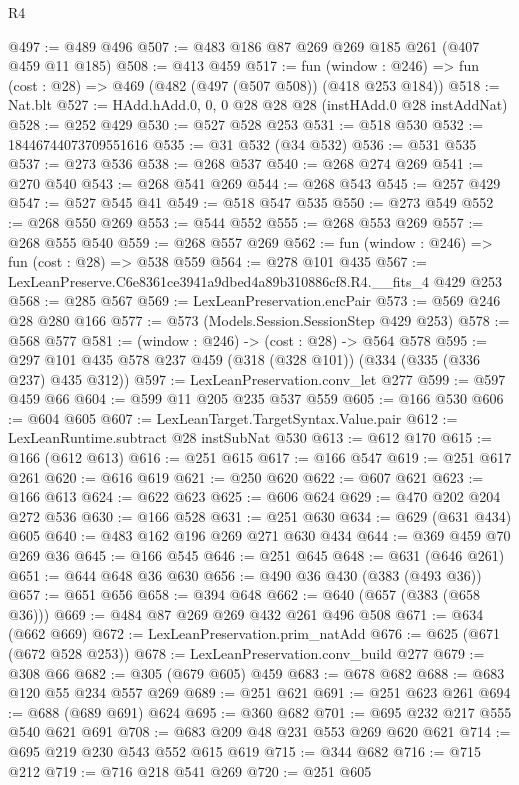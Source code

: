 \begin{lexlean}{R4}
\begin{coremodule}
@497 := @489 @496
@507 := @483 @186 @87 @269 @269 @185 @261 (@407 @459 @11 @185)
@508 := @413 @459
@517 := fun (window : @246) => fun (cost : @28) => @469 (@482 (@497 (@507 @508)) (@418 @253 @184))
@518 := Nat.blt
@527 := HAdd.hAdd.{0, 0, 0} @28 @28 @28 (instHAdd.{0} @28 instAddNat)
@528 := @252 @429
@530 := @527 @528 @253
@531 := @518 @530
@532 := 18446744073709551616
@535 := @31 @532 (@34 @532)
@536 := @531 @535
@537 := @273 @536
@538 := @268 @537
@540 := @268 @274 @269
@541 := @270 @540
@543 := @268 @541 @269
@544 := @268 @543
@545 := @257 @429
@547 := @527 @545 @41
@549 := @518 @547 @535
@550 := @273 @549
@552 := @268 @550 @269
@553 := @544 @552
@555 := @268 @553 @269
@557 := @268 @555 @540
@559 := @268 @557 @269
@562 := fun (window : @246) => fun (cost : @28) => @538 @559
@564 := @278 @101 @435
@567 := LexLeanPreserve.C6e8361ce3941a9dbed4a89b310886cf8.R4.__fits_4 @429 @253
@568 := @285 @567
@569 := LexLeanPreservation.encPair
@573 := @569 @246 @28 @280 @166
@577 := @573 (Models.Session.SessionStep @429 @253)
@578 := @568 @577
@581 := (window : @246) -> (cost : @28) -> @564 @578
@595 := @297 @101 @435 @578 @237 @459 (@318 (@328 @101)) (@334 (@335 (@336 @237) @435 @312))
@597 := LexLeanPreservation.conv_let @277
@599 := @597 @459 @66
@604 := @599 @11 @205 @235 @537 @559
@605 := @166 @530
@606 := @604 @605
@607 := LexLeanTarget.TargetSyntax.Value.pair
@612 := LexLeanRuntime.subtract @28 instSubNat @530
@613 := @612 @170
@615 := @166 (@612 @613)
@616 := @251 @615
@617 := @166 @547
@619 := @251 @617 @261
@620 := @616 @619
@621 := @250 @620
@622 := @607 @621
@623 := @166 @613
@624 := @622 @623
@625 := @606 @624
@629 := @470 @202 @204 @272 @536
@630 := @166 @528
@631 := @251 @630
@634 := @629 (@631 @434) @605
@640 := @483 @162 @196 @269 @271 @630 @434
@644 := @369 @459 @70 @269 @36
@645 := @166 @545
@646 := @251 @645
@648 := @631 (@646 @261)
@651 := @644 @648 @36 @630
@656 := @490 @36 @430 (@383 (@493 @36))
@657 := @651 @656
@658 := @394 @648
@662 := @640 (@657 (@383 (@658 @36)))
@669 := @484 @87 @269 @269 @432 @261 @496 @508
@671 := @634 (@662 @669)
@672 := LexLeanPreservation.prim_natAdd
@676 := @625 (@671 (@672 @528 @253))
@678 := LexLeanPreservation.conv_build @277
@679 := @308 @66
@682 := @305 (@679 @605) @459
@683 := @678 @682
@688 := @683 @120 @55 @234 @557 @269
@689 := @251 @621
@691 := @251 @623 @261
@694 := @688 (@689 @691) @624
@695 := @360 @682
@701 := @695 @232 @217 @555 @540 @621 @691
@708 := @683 @209 @48 @231 @553 @269 @620 @621
@714 := @695 @219 @230 @543 @552 @615 @619
@715 := @344 @682
@716 := @715 @212
@719 := @716 @218 @541 @269
@720 := @251 @605

\end{coremodule}
\end{lexlean}

